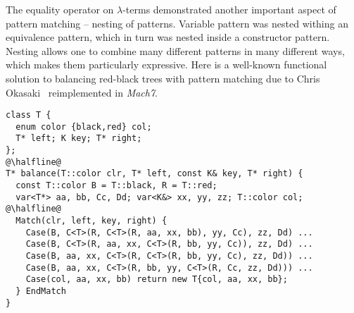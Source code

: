 %
%

The equality operator on $\lambda$-terms demonstrated another important aspect 
of pattern matching -- nesting of patterns. Variable pattern was nested withing 
an equivalence pattern, which in turn was nested inside a constructor pattern. 
Nesting allows one to combine many different patterns in many different ways, 
which makes them particularly expressive. Here is a well-known functional 
solution to balancing red-black trees with pattern matching due to Chris 
Okasaki~\cite[]{okasaki1999purely} reimplemented in \emph{Mach7}.

\begin{lstlisting}[keepspaces]
class T { 
  enum color {black,red} col; 
  T* left; K key; T* right; 
};
@\halfline@
T* balance(T::color clr, T* left, const K& key, T* right) {
  const T::color B = T::black, R = T::red;
  var<T*> aa, bb, Cc, Dd; var<K&> xx, yy, zz; T::color col;
@\halfline@
  Match(clr, left, key, right) {
    Case(B, C<T>(R, C<T>(R, aa, xx, bb), yy, Cc), zz, Dd) ...
    Case(B, C<T>(R, aa, xx, C<T>(R, bb, yy, Cc)), zz, Dd) ...
    Case(B, aa, xx, C<T>(R, C<T>(R, bb, yy, Cc), zz, Dd)) ...
    Case(B, aa, xx, C<T>(R, bb, yy, C<T>(R, Cc, zz, Dd))) ...
    Case(col, aa, xx, bb) return new T{col, aa, xx, bb};
  } EndMatch
}
\end{lstlisting}

